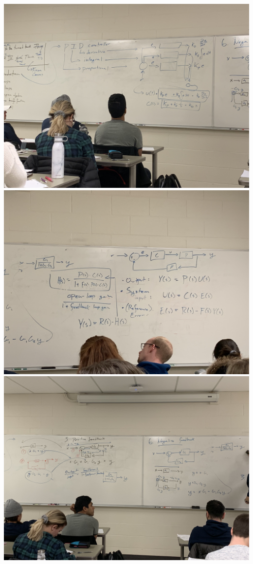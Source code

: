\documentclass[11pt]{book}
\begin{document}
\includegraphics[width=\textwidth]{figures/3_26_1.jpg}
\\
\includegraphics[width=\textwidth]{figures/3_26_2.jpg}
\\
\includegraphics[width=\textwidth]{figures/3_26_3.jpg}
\end{document}
